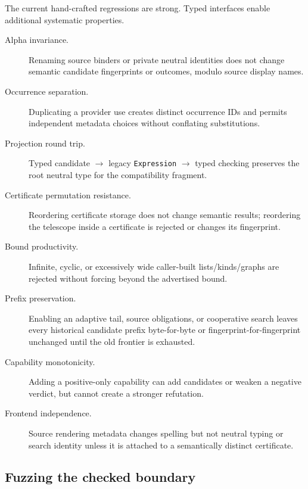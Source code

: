 \documentclass[11pt]{article}
\newcommand{\code}[1]{\texttt{#1}}
\begin{document}
The current hand-crafted regressions are strong.  Typed interfaces enable
additional systematic properties.

\begin{description}
  \item[Alpha invariance.]
    Renaming source binders or private neutral identities does not change
    semantic candidate fingerprints or outcomes, modulo source display names.

  \item[Occurrence separation.]
    Duplicating a provider use creates distinct occurrence IDs and permits
    independent metadata choices without conflating substitutions.

  \item[Projection round trip.]
    Typed candidate \(\to\) legacy \code{Expression} \(\to\) typed checking
    preserves the root neutral type for the compatibility fragment.

  \item[Certificate permutation resistance.]
    Reordering certificate storage does not change semantic results; reordering
    the telescope inside a certificate is rejected or changes its fingerprint.

  \item[Bound productivity.]
    Infinite, cyclic, or excessively wide caller-built lists/kinds/graphs are
    rejected without forcing beyond the advertised bound.

  \item[Prefix preservation.]
    Enabling an adaptive tail, source obligations, or cooperative search leaves
    every historical candidate prefix byte-for-byte or fingerprint-for-fingerprint
    unchanged until the old frontier is exhausted.

  \item[Capability monotonicity.]
    Adding a positive-only capability can add candidates or weaken a negative
    verdict, but cannot create a stronger refutation.

  \item[Frontend independence.]
    Source rendering metadata changes spelling but not neutral typing or search
    identity unless it is attached to a semantically distinct certificate.
\end{description}

\subsection{Fuzzing the checked boundary}
\end{document}
